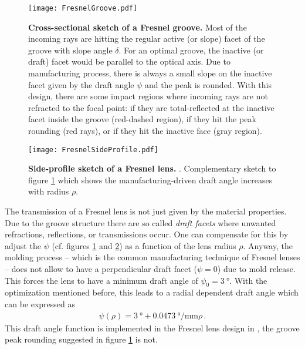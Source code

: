 \begin{figure}[h]
	\centering
	\texttt{[image: FresnelGroove.pdf]}
	\caption[Fresnel groove]{\textbf{Cross-sectional sketch of a Fresnel groove.} \cite{famous:eichler} Most of the incoming rays are hitting the regular active (or slope) facet of the groove with slope angle $\delta$. For an optimal groove, the inactive (or draft) facet would be parallel to the optical axis. Due to manufacturing process, there is always a small slope on the inactive facet given by the draft angle $\psi$ and the peak is rounded. With this design, there are some impact regions where incoming rays are not refracted to the focal point: if they are total-reflected at the inactive facet inside the groove (red-dashed region), if they hit the peak rounding (red rays), or if they hit the inactive face (gray region).}
	\label{iceact:model:fresnelgroove}	
\end{figure}

\begin{figure}[h]
	\centering
	\texttt{[image: FresnelSideProfile.pdf]}
	\caption[Fresnel side-profile]{\textbf{Side-profile sketch of a Fresnel lens.} \cite[adapted]{iceact:fresnellens:design}. Complementary sketch to figure \ref{iceact:model:fresnelgroove} which shows the manufacturing-driven draft angle increases with radius $\rho$.}
	\label{iceact:model:fresnelprofile}	
\end{figure}

The transmission of a Fresnel lens is not just given by the material properties. Due to the groove structure there are so called \textit{draft facets} where unwanted refractions, reflections, or transmissions occur. One can compensate for this by adjust the  $\psi$ (cf. figures \ref{iceact:model:fresnelgroove} and \ref{iceact:model:fresnelprofile}) as a function of the lens radius $\rho$. Anyway, the molding process -- which is the common manufacturing technique of Fresnel lenses -- does not allow to have a perpendicular draft facet ($\psi = 0$) due to mold release. This forces the lens to have a minimum draft angle of $\psi_0 = \SI{3}{\degree}$. With the optimization mentioned before, this leads to a radial dependent draft angle which can be expressed as \cite{famous:eichler, famous:niggemann}
\begin{align}
	\psi(\rho) = \SI{3}{\degree} + \SI{0.0473}{\degree\per\milli\meter}\rho\,.
\end{align}
This draft angle function is implemented in the Fresnel lens design in \geant, the groove peak rounding suggested in figure \ref{iceact:model:fresnelgroove} is not.

